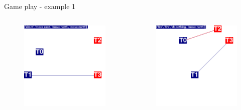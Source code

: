 \documentclass{beamer}
\begin{document}
\begin{frame}{Game play - example 1}
\begin{columns}
\begin{figure}[htp]
  \centering
  \includegraphics[width=\textwidth]{images/animation03/screenshot02.png}
\end{figure}
\begin{figure}[htp]
  \centering
  \includegraphics[width=\textwidth]{images/animation03/screenshot05.png}
\end{figure}


\end{columns}
\end{frame}
\end{document}
